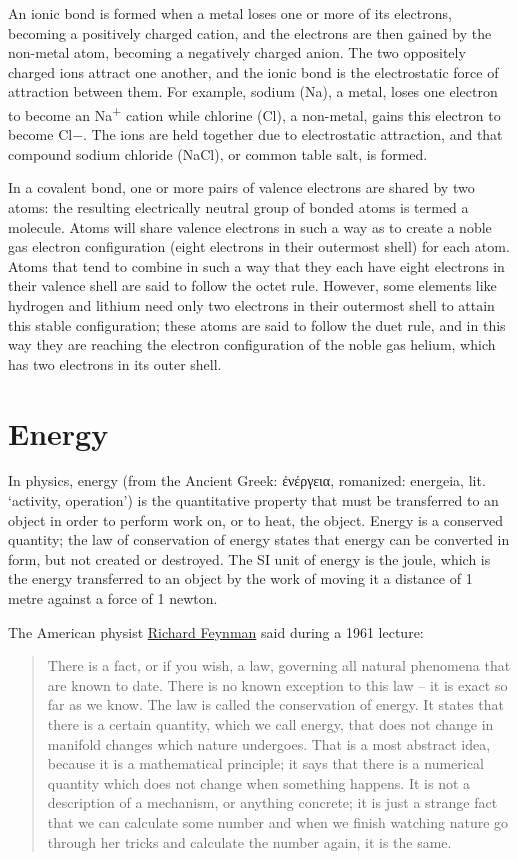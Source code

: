 An ionic bond is formed when a metal loses one or more of its electrons, becoming a positively charged cation, and the electrons are then gained by the non-metal atom, becoming a negatively charged anion. The two oppositely charged ions attract one another, and the ionic bond is the electrostatic force of attraction between them. For example, sodium (Na), a metal, loses one electron to become an Na\textsuperscript{+} cation while chlorine (Cl), a non-metal, gains this electron to become Cl−. The ions are held together due to electrostatic attraction, and that compound sodium chloride (NaCl), or common table salt, is formed.

In a covalent bond, one or more pairs of valence electrons are shared by two atoms: the resulting electrically neutral group of bonded atoms is termed a molecule. Atoms will share valence electrons in such a way as to create a noble gas electron configuration (eight electrons in their outermost shell) for each atom. Atoms that tend to combine in such a way that they each have eight electrons in their valence shell are said to follow the octet rule. However, some elements like hydrogen and lithium need only two electrons in their outermost shell to attain this stable configuration; these atoms are said to follow the duet rule, and in this way they are reaching the electron configuration of the noble gas helium, which has two electrons in its outer shell.

\hypertarget{energy-1}{%
\section{Energy}\label{energy-1}}

In physics, energy (from the Ancient Greek: ἐνέργεια, romanized: energeia, lit. `activity, operation') is the quantitative property that must be transferred to an object in order to perform work on, or to heat, the object. Energy is a conserved quantity; the law of conservation of energy states that energy can be converted in form, but not created or destroyed. The SI unit of energy is the joule, which is the energy transferred to an object by the work of moving it a distance of 1 metre against a force of 1 newton.

The American physist \href{https://en.wikipedia.org/wiki/Richard_Feynman}{Richard Feynman} said during a 1961 lecture:

\begin{quote}
There is a fact, or if you wish, a law, governing all natural phenomena that are known to date. There is no known exception to this law -- it is exact so far as we know. The law is called the conservation of energy. It states that there is a certain quantity, which we call energy, that does not change in manifold changes which nature undergoes. That is a most abstract idea, because it is a mathematical principle; it says that there is a numerical quantity which does not change when something happens. It is not a description of a mechanism, or anything concrete; it is just a strange fact that we can calculate some number and when we finish watching nature go through her tricks and calculate the number again, it is the same.
\end{quote}

